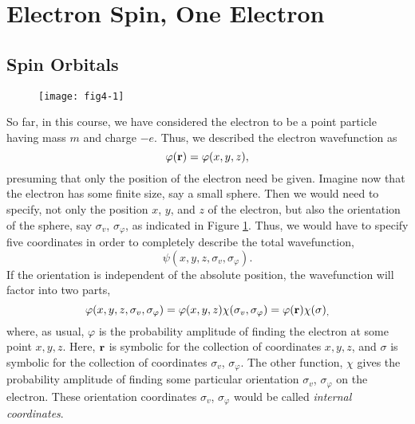\section{Electron Spin, One Electron}

\subsection{Spin Orbitals}

\begin{figure}
\texttt{[image: fig4-1]}
\caption{}
\label{fig4-01}
\end{figure}

So far, in this course, we have considered the electron to be a point particle
having mass $m$ and charge $-e$.  Thus, we described the electron wavefunction as
\begin{equation}
\varphi ( {\bf r} ) = \varphi ( x , y , z ) ,
\end{equation}
presuming that only the position of the electron need be given.
Imagine now that the electron has some finite size, say a small
sphere. Then we would need to specify, not only the position $x$, $y$,
and $z$ of the electron, but also the orientation of the sphere, say
$\sigma_v$, $\sigma_{\varphi}$, as indicated in Figure \ref{fig4-01}.
Thus, we would have to specify five coordinates in order to completely
describe the total wavefunction,
\begin{equation}
\psi ( x , y , z , \sigma_v , \sigma_{\varphi} ) .
\end{equation}
If the orientation is independent of the absolute position, the 
wavefunction will factor into two parts,
\begin{equation}
\varphi ( x , y , z , \sigma_v , \sigma_{\varphi} ) = \varphi ( x , y , 
z ) \chi ( \sigma_v , \sigma_{\varphi} ) = \varphi ( {\bf r} ) \chi ( 
\sigma )_ ,
\end{equation}
where, as usual, $\varphi$ is the probability amplitude of finding the
electron at some point $x, y, z$.  Here, ${\bf r}$ is symbolic for the
collection of coordinates $ x , y , z$, and $\sigma$ is symbolic for
the collection of coordinates $\sigma_v$, $\sigma_{\varphi}$.  The
other function, $\chi$ gives the probability amplitude of finding some
particular orientation $\sigma_v$, $\sigma_{\varphi}$ on the electron.
These orientation coordinates $\sigma_v$, $\sigma_{\varphi}$ would be
called \emph{internal coordinates}.

